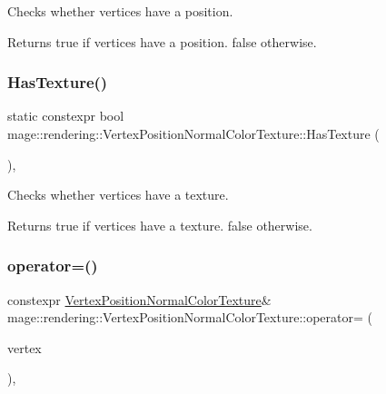 Checks whether vertices have a position.

\begin{DoxyReturn}{Returns}
{\ttfamily true} if vertices have a position. {\ttfamily false} otherwise. 
\end{DoxyReturn}
\hypertarget{structmage_1_1rendering_1_1_vertex_position_normal_color_texture_a8b5e0a50a6119868ebf90247d321f172}{}\label{structmage_1_1rendering_1_1_vertex_position_normal_color_texture_a8b5e0a50a6119868ebf90247d321f172} 
\subsubsection{\texorpdfstring{Has\+Texture()}{HasTexture()}}
{\footnotesize\ttfamily static constexpr bool mage\+::rendering\+::\+Vertex\+Position\+Normal\+Color\+Texture\+::\+Has\+Texture (\begin{DoxyParamCaption}{ }\end{DoxyParamCaption})\hspace{0.3cm}{\ttfamily [static]}, {\ttfamily [noexcept]}}

Checks whether vertices have a texture.

\begin{DoxyReturn}{Returns}
{\ttfamily true} if vertices have a texture. {\ttfamily false} otherwise. 
\end{DoxyReturn}
\hypertarget{structmage_1_1rendering_1_1_vertex_position_normal_color_texture_a79367a6d31a3d70603b216dc22459756}{}\label{structmage_1_1rendering_1_1_vertex_position_normal_color_texture_a79367a6d31a3d70603b216dc22459756} 
\subsubsection{\texorpdfstring{operator=()}{operator=()}\hspace{0.1cm}{\footnotesize\ttfamily [1/2]}}
{\footnotesize\ttfamily constexpr \hyperlink{structmage_1_1rendering_1_1_vertex_position_normal_color_texture}{Vertex\+Position\+Normal\+Color\+Texture}\& mage\+::rendering\+::\+Vertex\+Position\+Normal\+Color\+Texture\+::operator= (\begin{DoxyParamCaption}\item[{const \hyperlink{structmage_1_1rendering_1_1_vertex_position_normal_color_texture}{Vertex\+Position\+Normal\+Color\+Texture} \&}]{vertex }\end{DoxyParamCaption})\hspace{0.3cm}{\ttfamily [default]}, {\ttfamily [noexcept]}}

